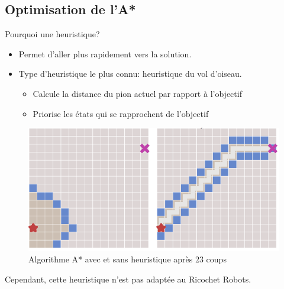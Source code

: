 \documentclass{beamer}
\begin{document}
    \subsection{Optimisation de l'A*}
        \begin{frame}{Pourquoi une heuristique?}
            \begin{itemize}
                \item Permet d'aller plus rapidement vers la solution.
                \item  Type d'heuristique le plus connu: heuristique du vol d'oiseau.
                
                \begin{itemize}
                    \item Calcule la distance du pion actuel par rapport à l'objectif
                    \item Priorise les états qui se rapprochent de l'objectif
                \end{itemize}
            \end{itemize}
            \begin{figure}
                \centering
                \includegraphics[scale=0.35]{images/2.PNG}
                \caption{Algorithme A* avec et sans heuristique après 23 coups\cite{redblob}}
            \end{figure}
            Cependant, cette heuristique n'est pas adaptée au Ricochet Robots.
        \end{frame}
\end{document}
